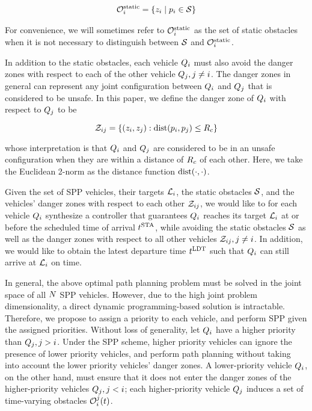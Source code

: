 \begin{equation}
\begin{aligned}
\mathcal{O}^\text{static}_i = \{z_i \mid p_i \in \mathcal{S}\}
\end{aligned}
\end{equation}

For convenience, we will sometimes refer to $\mathcal{O}^\text{static}_i$ as the set of static obstacles when it is not necessary to distinguish between $\mathcal{S}$ and $\mathcal{O}^\text{static}_i$.

In addition to the static obstacles, each vehicle $Q_{i}$ must also avoid the danger zones with respect to each of the other vehicle $Q_{j}, j\neq i$. The danger zones in general can represent any joint configuration between $Q_{i}$ and $Q_{j}$ that is considered to be unsafe. In this paper, we define the danger zone of $Q_{i}$ with respect to $Q_{j}$ to be

\begin{equation}
\mathcal{Z}_{ij} = \{(z_i, z_j): \text{dist}(p_i, p_j) \le R_c\}
\end{equation}

\noindent whose interpretation is that $Q_{i}$ and $Q_{j}$ are considered to be in an unsafe configuration when they are within a distance of $R_c$ of each other. Here, we take the Euclidean 2-norm as the distance function $\text{dist}(\cdot, \cdot)$.

Given the set of SPP vehicles, their targets $\mathcal{L}_i$, the static obstacles $\mathcal{S}$, and the vehicles' danger zones with respect to each other $\mathcal{Z}_{ij}$, we would like to for each vehicle $Q_{i}$ synthesize a controller that guarantees $Q_{i}$ reaches its target $\mathcal{L}_i$ at or before the scheduled time of arrival $t^\text{STA}$, while avoiding the static obstacles $\mathcal{S}$ as well as the danger zones with respect to all other vehicles $\mathcal{Z}_{ij}, j\neq i$. In addition, we would like to obtain the latest departure time $t^\text{LDT}$ such that $Q_{i}$ can still arrive at $\mathcal{L}_i$ on time.

In general, the above optimal path planning problem must be solved in the joint space of all $N$ SPP vehicles. However, due to the high joint problem dimensionality, a direct dynamic programming-based solution is intractable. Therefore, we propose to assign a priority to each vehicle, and perform SPP given the assigned priorities. Without loss of generality, let $Q_{i}$ have a higher priority than $Q_{j}, j>i$. Under the SPP scheme, higher priority vehicles can ignore the presence of lower priority vehicles, and perform path planning without taking into account the lower priority vehicles' danger zones. A lower-priority vehicle $Q_{i}$, on the other hand, must ensure that it does not enter the danger zones of the higher-priority vehicles $Q_{j}, j<i$; each higher-priority vehicle $Q_{j}$ induces a set of time-varying obstacles $\mathcal{O}_i^j(t)$.

